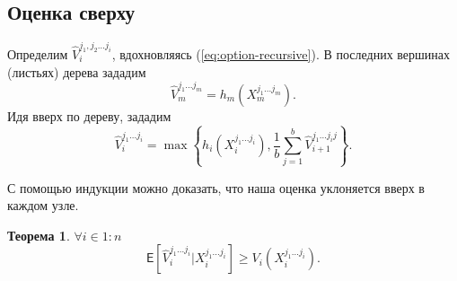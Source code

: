 \documentclass[specialist,
               substylefile = spbu.rtx,
               subf,href,colorlinks=true, 12pt]{disser}
\newtheorem{theorem}{Теорема}
\begin{document}
		\subsection{Оценка сверху}
		\par Определим $\hat{V}_i^{j_1, j_2 \ldots j_i}$, вдохновляясь (\ref{eq:option-recursive}). В последних вершинах (листьях) дерева зададим
		\begin{equation}\label{eq:upper-terminal}
			\hat{V}_m^{j_1 \ldots j_m} = h_m\left(X_m^{j_1 \ldots j_m}\right).
		\end{equation}
		Идя вверх по дереву, зададим
		\begin{equation}\label{eq:upper-node}
			\hat{V}_i^{j_1 \ldots j_i} = \max \left\lbrace h_i \left( X_i^{j_1 \ldots j_i} \right), \frac{1}{b} \sum_{j = 1}^b \hat{V}_{i+1}^{j_1 \ldots j_i j}\right\rbrace .
		\end{equation}
		\par С помощью индукции можно доказать, что наша оценка уклоняется вверх в каждом узле.
		\begin{theorem}
			$\forall i \in 1:n$
			\begin{equation*}
			\mathsf{E}\left[\hat{V}_i^{j_1\ldots j_i}|X_i^{j_1\ldots j_i}\right] \geq V_i\left(X_i^{j_1\ldots j_i}\right).
			\end{equation*}
		\end{theorem}
\end{document}
